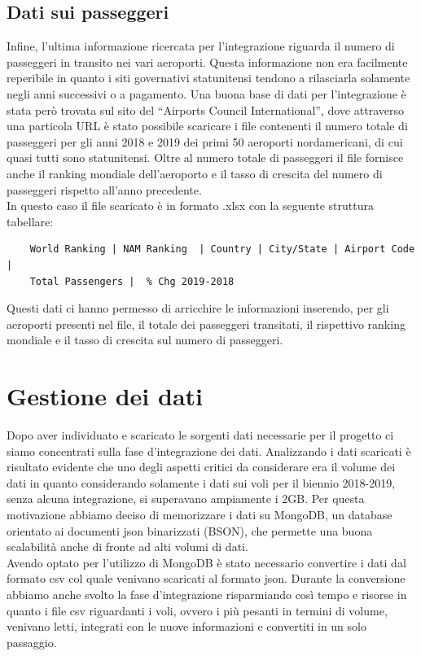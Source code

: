 \documentclass[12pt]{article}
\begin{document}
\subsection{Dati sui passeggeri}
Infine, l'ultima informazione ricercata per l'integrazione riguarda il numero di passeggeri in transito nei vari aeroporti. Questa informazione non era facilmente reperibile in quanto i siti governativi statunitensi tendono a rilasciarla solamente negli anni successivi o a pagamento. Una buona base di dati per l'integrazione è stata però trovata sul sito del ``Airports Council International''\cite{ACI}, dove attraverso una particola URL è stato possibile scaricare i file contenenti il numero totale di passeggeri per gli anni 2018 e 2019 dei primi 50 aeroporti nordamericani, di cui quasi tutti sono statunitensi. Oltre al numero totale di passeggeri il file fornisce anche il ranking mondiale dell'aeroporto e il tasso di crescita del numero di passeggeri rispetto all'anno precedente.\\
In questo caso il file scaricato è in formato .xlsx con la seguente struttura tabellare:
\begin{verbatim}
    World Ranking |	NAM Ranking	 | Country | City/State	| Airport Code | 
    Total Passengers |	% Chg 2019-2018
\end{verbatim}
Questi dati ci hanno permesso di arricchire le informazioni inserendo, per gli aeroporti presenti nel file, il totale dei passeggeri transitati, il rispettivo ranking mondiale e il tasso di crescita sul numero di passeggeri.

\newpage
\section{Gestione dei dati}
Dopo aver individuato e scaricato le sorgenti dati necessarie per il progetto ci siamo concentrati sulla fase d'integrazione dei dati. Analizzando i dati scaricati è risultato evidente che uno degli aspetti critici da considerare era il volume dei dati in quanto considerando solamente i dati sui voli per il biennio 2018-2019, senza alcuna integrazione, si superavano ampiamente i 2GB. Per questa motivazione abbiamo deciso di memorizzare i dati su MongoDB, un database orientato ai documenti json binarizzati (BSON), che permette una buona scalabilità anche di fronte ad alti volumi di dati.\\
Avendo optato per l'utilizzo di MongoDB è stato necessario convertire i dati dal formato csv col quale venivano scaricati al formato json. Durante la conversione abbiamo anche svolto la fase d'integrazione risparmiando così tempo e risorse in quanto i file csv riguardanti i voli, ovvero i più pesanti in termini di volume, venivano letti, integrati con le nuove informazioni e convertiti in un solo passaggio.
\end{document}
